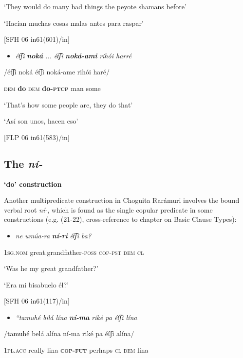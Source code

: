 ‘They would do many bad things the peyote shamans before’

‘Hacían muchas cosas malas antes para raspar’

  [SFH 06 in61(601)/in]

\begin{itemize}
\item \textit{ét͡ʃi} \textbf{\textit{noká}} \textit{...  ét͡ʃi} \textbf{\textit{noká-ami}} \textit{rihói   harré}  
\end{itemize}

/ét͡ʃi  noká    ét͡ʃi  noká-ame  rihói  haré/

\textsc{dem} \textbf{do}    \textsc{dem} \textbf{do-\textsc{ptcp}}  man  some

‘That’s how some people are, they do that’

‘Así son unos, hacen eso’

  [FLP 06 in61(583)/in]

\subsection{The \textit{ní-} }\textbf{‘do’ construction}
\label{subsec: the ni- 'do' construction}

Another multipredicate construction in Choguita Rarámuri involves the bound verbal root \textit{ní-}, which is found as the single copular predicate in some constructions (e.g. (21-22), cross-reference to chapter on Basic Clause Types):

\begin{itemize}
\item \textit{ne     umúa-ra} \textbf{\textit{ní-ri}} \textit{ét͡ʃi   ba?}  
\end{itemize}

  1\textsc{sg.nom}  great.grandfather-\textsc{poss}  \textsc{cop-pst}  \textsc{dem}  \textsc{cl}

  ‘Was he my great grandfather?’

‘Era mi bisabuelo él?’

  [SFH 06 in61(117)/in]

\begin{itemize}
\item \textit{“tamuhé   bilá   lína} \textbf{\textit{ní-ma} } \textit{riké     pa   ét͡ʃi   lína} 
\end{itemize}

/tamuhé  belá  alína  ní-ma    riké    pa  ét͡ʃi  alína/

1\textsc{pl.acc}   really   lina   \textbf{\textsc{cop-fut}}   perhaps   \textsc{cl   dem} lina   

